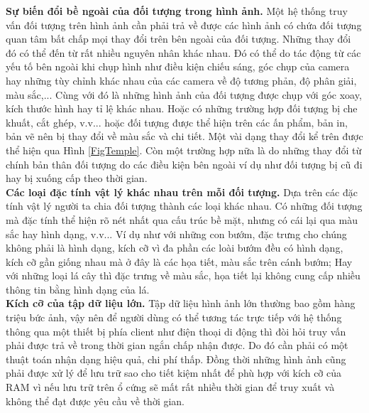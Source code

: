  \textbf{Sự biến đổi bề ngoài của đối tượng trong hình ảnh.} Một hệ thống truy vấn đối tượng trên hình ảnh cần phải trả về được các hình ảnh có chứa đối tượng quan tâm bất chấp mọi thay đổi trên bên ngoài của đối tượng. Những thay đổi đó có thể đến từ rất nhiều nguyên nhân khác nhau. Đó có thể do tác động từ các yếu tố bên ngoài khi chụp hình như điều kiện chiếu sáng, góc chụp của camera hay những tùy chỉnh khác nhau của các camera về độ tương phản, độ phân giải, màu sắc,... Cùng với đó là những hình ảnh của đối tượng được chụp với góc xoay, kích thước hình hay tỉ lệ khác nhau. Hoặc có những trường hợp đối tượng bị che khuất, cắt ghép, v.v... hoặc đối tượng được thể hiện trên các ấn phẩm, bản in, bản vẽ nên bị thay đổi về màu sắc và chi tiết. Một vài dạng thay đổi kể trên được thể hiện qua Hình \ref{FigTemple}. Còn một trường hợp nữa là do những thay đổi từ chính bản thân đối tượng do các điều kiện bên ngoài ví dụ như đối tượng bị cũ đi hay bị xuống cấp theo thời gian.\\ 
 \textbf{Các loại đặc tính vật lý khác nhau trên mỗi đối tượng.} Dựa trên các đặc tính vật lý người ta chia đối tượng thành các loại khác nhau. Có những đối tượng mà đặc tính thể hiện rõ nét nhất qua cấu trúc bề mặt, nhưng có cái lại qua màu sắc hay hình dạng, v.v... Ví dụ như với những con bướm, đặc trưng cho chúng không phải là hình dạng, kích cỡ vì đa phần các loài bướm đều có hình dạng, kích cỡ gần giống nhau mà ở đây là các họa tiết, màu sắc trên cánh bướm; Hay với những loại lá cây thì đặc trưng về màu sắc, họa tiết lại không cung cấp nhiều thông tin bằng hình dạng của lá.\\
 \textbf{Kích cỡ của tập dữ liệu lớn.} Tập dữ liệu hình ảnh lớn thường bao gồm hàng triệu bức ảnh, vậy nên để người dùng có thể tương tác trực tiếp với hệ thống thông qua một thiết bị phía client như điện thoại di động thì đòi hỏi truy vấn phải được trả về trong thời gian ngắn chấp nhận được. Do đó cần phải có một thuật toán nhận dạng hiệu quả, chi phí thấp. Đồng thời những hình ảnh cũng phải được xử lý để lưu trữ sao cho tiết kiệm nhất để phù hợp với kích cỡ của RAM vì nếu lưu trữ trên ổ cứng sẽ mất rất nhiều thời gian để truy xuất và không thể đạt được yêu cầu về thời gian.\\
 
